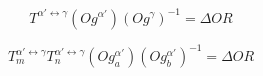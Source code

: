$$T^{\alpha'\leftrightarrow\gamma}\left(Og^{\alpha'}\right)\left(Og^{\gamma}\right)^{-1}=\Delta OR\label{eq:1}$$

$$T_{m}^{\alpha'\leftrightarrow\gamma}T_{n}^{\alpha'\leftrightarrow\gamma}\left(Og_{a}^{\alpha'}\right)\left(Og_{b}^{\alpha'}\right)^{-1}=\Delta OR\label{eq:2}$$
